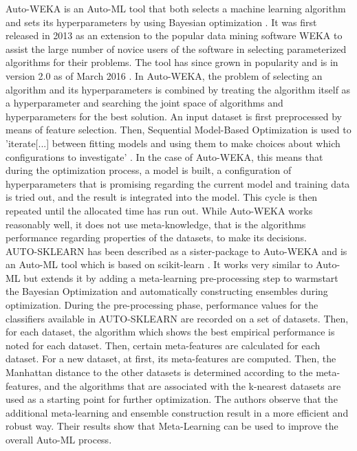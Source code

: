 \documentclass[12pt]{scrartcl}
\begin{document}
Auto-WEKA is an Auto-ML tool that both selects a machine learning algorithm and sets its hyperparameters by using Bayesian optimization \cite{thornton2013auto}. It was first released in 2013 as an extension to the popular data mining software WEKA \cite{hall2009weka} to assist the large number of novice users of the software in selecting parameterized algorithms for their problems. The tool has since grown in popularity and is in version 2.0 as of March 2016 \cite{kotthoff2016auto}. In Auto-WEKA, the problem of selecting an algorithm and its hyperparameters is combined by treating the algorithm itself as a hyperparameter and searching the joint space of algorithms and hyperparameters for the best solution. An input dataset is first preprocessed by means of feature selection. Then, Sequential Model-Based Optimization is used to 'iterate[...] between fitting models and using them to make choices about which configurations to investigate' \cite{hutter2011sequential}. In the case of Auto-WEKA, this means that during the optimization process, a model is built, a configuration of hyperparameters that is promising regarding the current model and training data is tried out, and the result is integrated into the model. This cycle is then repeated until the allocated time has run out. While Auto-WEKA works reasonably well, it does not use meta-knowledge, that is the algorithms performance regarding properties of the datasets, to make its decisions. \\

AUTO-SKLEARN has been described as a sister-package to Auto-WEKA and is an Auto-ML tool which is based on scikit-learn \cite{feurer2015efficient}. It works very similar to Auto-ML but extends it by adding a meta-learning pre-processing step to warmstart the Bayesian Optimization and automatically constructing ensembles during optimization. During the pre-processing phase, performance values for the classifiers available in AUTO-SKLEARN are recorded on a set of datasets. Then, for each dataset, the algorithm which shows the best empirical performance is noted for each dataset. Then, certain meta-features are calculated for each dataset. For a new dataset, at first, its meta-features are computed. Then, the Manhattan distance to the other datasets is determined according to the meta-features, and the algorithms that are associated with the k-nearest datasets are used as a starting point for further optimization. The authors observe that the additional meta-learning and ensemble construction result in a more efficient and robust way. Their results show that Meta-Learning can be used to improve the overall Auto-ML process.\\
\end{document}
